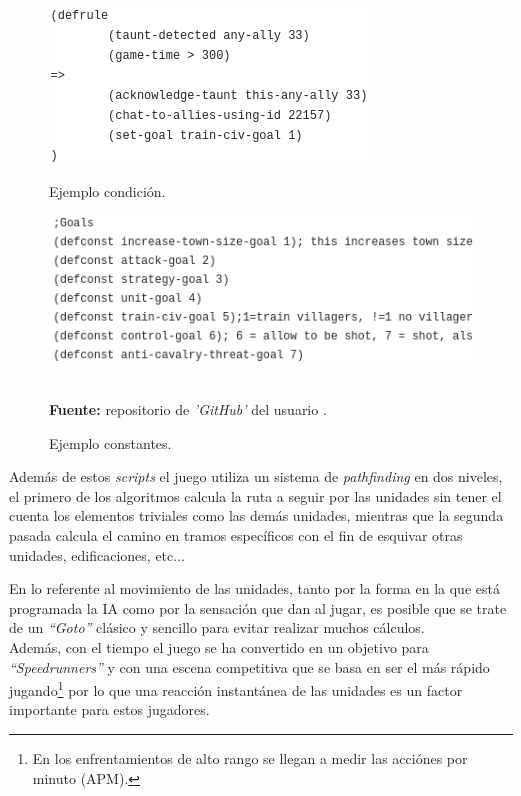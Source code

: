 \begin{figure}[ht]
\centering
\begin{minipage}[c]{0.45\linewidth}
	\hspace{9mm}
	\includegraphics[height=0.11\textheight]{imagenes/marco_teo/referentes/aoe_scripting_3.png}
	\caption{Ejemplo condición.}
	\label{img:aoe_script_3}
\end{minipage}
\begin{minipage}[c]{0.45\linewidth}
	\hspace{2mm}
	\includegraphics[height=0.11\textheight]{imagenes/marco_teo/referentes/aoe_scripting_4.png}
	\caption{Ejemplo constantes.}
	\label{img:aoe_script_4}
\end{minipage}\\[3mm]
\textbf{Fuente:} repositorio de \textit{'GitHub'} del usuario \citeauthor*{Andygmb2014}. 
\end{figure}

Además de estos \textit{scripts} el juego utiliza un sistema de \textit{pathfinding} en dos niveles,
el primero de los algoritmos calcula la ruta a seguir por las unidades sin tener el cuenta los
elementos triviales como las demás unidades, mientras que la segunda pasada calcula el camino 
en tramos específicos con el fin de esquivar otras unidades, edificaciones, etc...

En lo referente al movimiento de las unidades, tanto por la forma en la que está programada
la \ac{IA} como por la sensación que dan al jugar, es posible que se trate de un  \textit{``Goto''}
clásico y sencillo para evitar realizar muchos cálculos. \\
Además, con el tiempo el juego se ha convertido en un objetivo para \textit{``Speedrunners''}
y con una escena competitiva que se basa en ser el más rápido jugando\footnote{En los enfrentamientos de alto rango se llegan a medir las acciónes por minuto (APM).}
por lo que una reacción instantánea de las unidades es un factor importante para  estos
jugadores.

